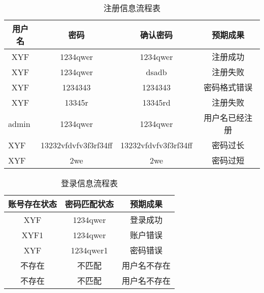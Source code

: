 \documentclass[UTF8,14pt]{article}
\numberwithin{figure}{subsubsection}
\numberwithin{table}{subsubsection}
\begin{document}
\begin{table}[H]
	\centering
	\begin{tabular}{cccc}
		\hline
		\multicolumn{1}{c}{用户名} & \multicolumn{1}{c}{密码}     & \multicolumn{1}{c}{确认密码} & \multicolumn{1}{c}{预期成果} \\ \hline
		XYF                        & \multicolumn{1}{c}{1234qwer} & 1234qwer                     & 注册成功                     \\
		XYF                        & \multicolumn{1}{c}{1234qwer} & dsadb                        & 注册失败                     \\
		XYF                        & \multicolumn{1}{c}{1234343}  & 1234343                      & 密码格式错误                 \\
		XYF                        & 13345r                       & 13345rd                      & 注册失败                     \\
		\multicolumn{1}{l}{admin}  & 1234qwer                     & 1234qwer                     & 用户名已经注册               \\
		\multicolumn{1}{l}{XYF}    & 13232vfdvfv3f3rf34ff         & 13232vfdvfv3f3rf34ff         & 密码过长                     \\
		\multicolumn{1}{l}{XYF}    & 2we                          & 2we                          & 密码过短                     \\\hline
	\end{tabular}
	\caption{注册信息流程表}
\end{table}
\begin{table}[H]
	\centering
	\begin{tabular}{ccc}
		\hline
		\multicolumn{1}{c}{账号存在状态} & \multicolumn{1}{c}{密码匹配状态} & \multicolumn{1}{c}{预期成果} \\ \hline
		XYF                              & 1234qwer                         & 登录成功                     \\
		XYF1                             & 1234qwer                         & 账户错误                     \\
		XYF                              & 1234qwer1                        & 密码错误                     \\
		不存在                           & 不匹配                           & 用户名不存在                 \\
		不存在                           & 不匹配                           & 用户名不存在                 \\\hline
	\end{tabular}
	\caption{登录信息流程表}
\end{table}
\end{document}
